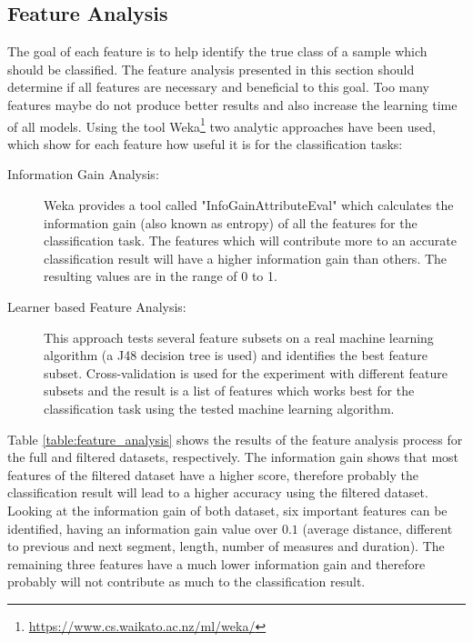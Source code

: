 \subsection{Feature Analysis}
\label{sec:feature_analysis}

The goal of each feature is to help identify the true class of a sample which should be classified. The feature analysis presented in this section should determine if all features are necessary and beneficial to this goal. Too many features maybe do not produce better results and also increase the learning time of all models. Using the tool Weka\footnote{\url{https://www.cs.waikato.ac.nz/ml/weka/}} two analytic approaches have been used, which show for each feature how useful it is for the classification tasks:

\begin{description}

\item[Information Gain Analysis:] Weka provides a tool called "InfoGainAttributeEval" which calculates the information gain (also known as entropy) of all the features for the classification task. The features which will contribute more to an accurate classification result will have a higher information gain than others. The resulting values are in the range of 0 to 1.

\item[Learner based Feature Analysis:] This approach tests several feature subsets on a real machine learning algorithm (a J48 decision tree is used) and identifies the best feature subset. Cross-validation is used for the experiment with different feature subsets and the result is a list of features which works best for the classification task using the tested machine learning algorithm. %

\end{description}

Table \ref{table:feature_analysis} shows the results of the feature analysis process for the full and filtered datasets, respectively. The information gain shows that most features of the filtered dataset have a higher score, therefore probably the classification result will lead to a higher accuracy using the filtered dataset. Looking at the information gain of both dataset, six important features can be identified, having an information gain value over $0.1$ (average distance, different to previous and next segment, length, number of measures and duration). The remaining three features have a much lower information gain and therefore probably will not contribute as much to the classification result.


